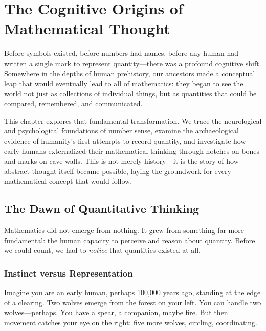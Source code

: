 
\chapter{The Cognitive Origins of Mathematical Thought}
\label{ch:cognitive-origins}

\begin{chapterintro}
	Before symbols existed, before numbers had names, before any human had written a single mark to represent quantity—there was a profound cognitive shift. Somewhere in the depths of human prehistory, our ancestors made a conceptual leap that would eventually lead to all of mathematics: they began to see the world not just as collections of individual things, but as quantities that could be compared, remembered, and communicated.
	
	This chapter explores that fundamental transformation. We trace the neurological and psychological foundations of number sense, examine the archaeological evidence of humanity's first attempts to record quantity, and investigate how early humans externalized their mathematical thinking through notches on bones and marks on cave walls. This is not merely history—it is the story of how abstract thought itself became possible, laying the groundwork for every mathematical concept that would follow.
\end{chapterintro}

\section{The Dawn of Quantitative Thinking}
\label{sec:dawn-quantity}

\begin{sectionintro}
	Mathematics did not emerge from nothing. It grew from something far more fundamental: the human capacity to perceive and reason about quantity. Before we could count, we had to \textit{notice} that quantities existed at all.
\end{sectionintro}

\subsection{Instinct versus Representation}

Imagine you are an early human, perhaps 100,000 years ago, standing at the edge of a clearing. Two wolves emerge from the forest on your left. You can handle two wolves—perhaps. You have a spear, a companion, maybe fire. But then movement catches your eye on the right: five more wolves, circling, coordinating. 

